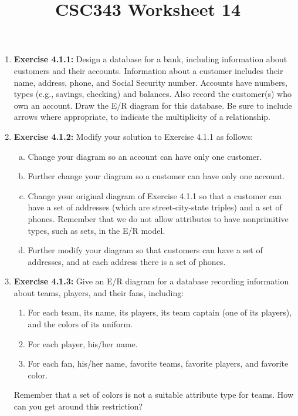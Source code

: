 \documentclass[12pt]{article}
\begin{document}
\title{CSC343 Worksheet 14}
\maketitle

\begin{enumerate}[1.]
    \item \textbf{Exercise 4.1.1:} Design a database for a bank, including information
    about customers and their accounts. Information about a customer includes their
    name, address, phone, and Social Security number. Accounts have numbers,
    types (e.g., savings, checking) and balances. Also record the customer(s) who
    own an account. Draw the E/R diagram for this database. Be sure to include
    arrows where appropriate, to indicate the multiplicity of a relationship.

    \item \textbf{Exercise 4.1.2:} Modify your solution to Exercise 4.1.1 as follows:

    \bigskip

    \begin{enumerate}[a)]
        \item Change your diagram so an account can have only one customer.
        \item Further change your diagram so a customer can have only one account.
        \item Change your original diagram of Exercise 4.1.1 so that a customer can have a set of addresses (which are street-city-state triples) and a set of phones. Remember that we do not allow attributes to have nonprimitive types, such as sets, in the E/R model.
        \item Further modify your diagram so that customers can have a set of addresses, and at each address there is a set of phones.
    \end{enumerate}

    \item \textbf{Exercise 4.1.3:} Give an E/R diagram for a database recording information
    about teams, players, and their fans, including:

    \begin{enumerate}[1.]
        \item For each team, its name, its players, its team captain (one of its players), and the colors of its uniform.
        \item For each player, his/her name.
        \item For each fan, his/her name, favorite teams, favorite players, and favorite color.
    \end{enumerate}

    \bigskip

    Remember that a set of colors is not a suitable attribute type for teams. How can you get around this restriction?

\end{enumerate}
\end{document}
